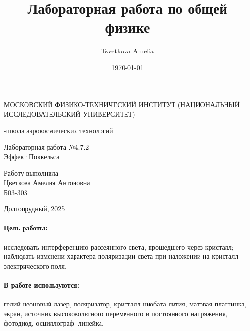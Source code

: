 \documentclass[a4paper,12pt]{article}
\author{Tsvetkova Amelia}
\title{Лабораторная работа по общей физике}
\date{\today}
\begin{document}
\begin{titlepage}
    \newpage
    \begin{center}
    {\large МОСКОВСКИЙ ФИЗИКО-ТЕХНИЧЕСКИЙ ИНСТИТУТ (НАЦИОНАЛЬНЫЙ ИССЛЕДОВАТЕЛЬСКИЙ УНИВЕРСИТЕТ)}
    \vspace{1cm}

    {-школа аэрокосмических технологий}
    \vspace{6em}
    \end{center}
    
    \vspace{1.2em}

    \begin{center}
    \Large Лабораторная работа №4.7.2 \\
    Эффект Поккельса
    \linebreak
    \end{center}
    
    \vspace{11em}
    
    \begin{flushright}
                       {\large Работу выполнила\\
                       Цветкова Амелия Антоновна\\
                       Б03-303 }
    \end{flushright}

    \vspace{\fill}

    \begin{center}
    Долгопрудный, 2025
    \end{center}

    \end{titlepage}

\paragraph{Цель работы:} исследовать интерференцию рассеянного света, прошедшего через кристалл; наблюдать изменени характера поляризации света при наложении на кристалл электрического поля. 

\paragraph{В работе используются:} гелий-неоновый лазер, поляризатор, кристалл ниобата лития, матовая пластинка, экран, источник высоковольтного переменного и постоянного напряжения, фотодиод, осциллограф, линейка.
\end{document}
